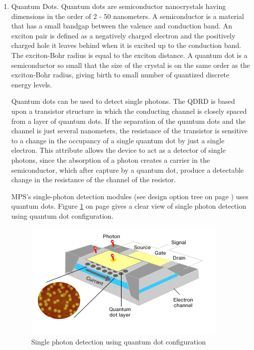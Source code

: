 \begin{enumerate}[i]
\item Quantum Dots. Quantum dots are semiconductor nanocrystals having dimensions in the order of 2 - 50 nanometers. A semiconductor is a material that has a small bandgap between the valence and conduction band. An exciton pair is defined as a negatively charged electron and the positively charged hole it leaves behind when it is excited up to the conduction band. The exciton-Bohr radius is equal to the exciton distance. A quantum dot is a semiconductor so small that the size of the crystal is on the same order as the exciton-Bohr radius, giving birth to small number of quantized discrete energy levels. 

Quantum dots can be used to detect single photons. The \ac{QDRD} is based upon a transistor structure in which the conducting channel is closely spaced from a layer of quantum dots. If the separation of the quantum dots and the channel is just several nanometers, the resistance of the transistor is sensitive to a change in the occupancy of a single quantum dot by just a single electron. This attribute allows the device to act as a detector of single photons, since the absorption of a photon creates a carrier in the semiconductor, which after capture by a quantum dot, produce a detectable change in the resistance of the channel of the resistor.
\cite{quantumdots}

MPS's single-photon detection modules (see design option tree on page \pageref{DOS_receiver}) uses quantum dots.
Figure \ref{quantumdot} on page \pageref{quantumdot} gives a clear view of single photon detection using quantum dot configuration.
\begin{figure} [ht]
	\begin{center}
\includegraphics[scale=1]{chapters/img/blDOreceiverQDRD.png}	
\caption{Single photon detection using quantum dot configuration}
\label{quantumdot}
\end{center}
\end{figure}


\end{enumerate}
